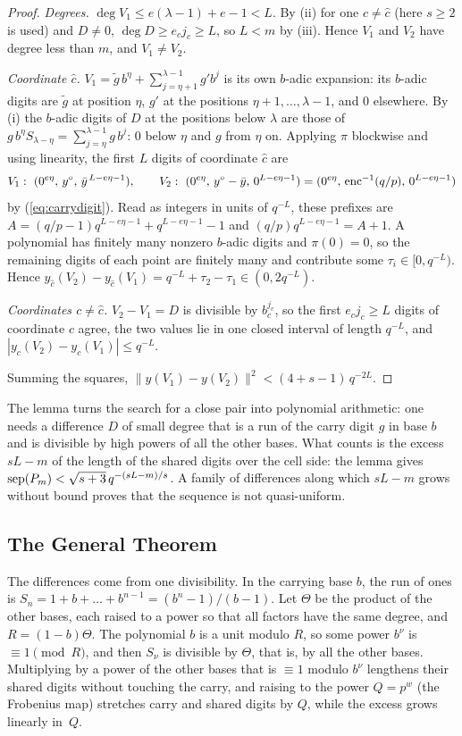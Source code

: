 \begin{proof}
\emph{Degrees.} $\deg V_1\le e(\lambda-1)+e-1<L$. By (ii) for one $c\ne\hat c$ (here $s\ge2$ is used) and $D\ne0$, $\deg D\ge e_cj_c\ge L$, so $L<m$ by (iii). Hence $V_1$ and $V_2$ have degree less than $m$, and $V_1\ne V_2$.

\emph{Coordinate $\hat c$.} $V_1=\tilde g\,b^\eta+\sum_{j=\eta+1}^{\lambda-1}g'b^j$ is its own $b$-adic expansion: its $b$-adic digits are $\tilde g$ at position $\eta$, $g'$ at the positions $\eta+1,\dots,\lambda-1$, and $0$ elsewhere. By (i) the $b$-adic digits of $D$ at the positions below $\lambda$ are those of $g\,b^\eta S_{\lambda-\eta}=\sum_{j=\eta}^{\lambda-1}g\,b^j$: $0$ below $\eta$ and $g$ from $\eta$ on. Applying $\pi$ blockwise and using linearity, the first $L$ digits of coordinate $\hat c$ are
\[
V_1:\ (0^{e\eta},\,y^\circ,\,\bar y^{\,L-e\eta-1}),\qquad V_2:\ (0^{e\eta},\,y^\circ-\bar y,\,0^{L-e\eta-1})=(0^{e\eta},\,\operatorname{enc}^{-1}(q/p),\,0^{L-e\eta-1})
\]
by (\ref{eq:carrydigit}). Read as integers in units of $q^{-L}$, these prefixes are $A=(q/p-1)q^{L-e\eta-1}+q^{L-e\eta-1}-1$ and $(q/p)q^{L-e\eta-1}=A+1$. A polynomial has finitely many nonzero $b$-adic digits and $\pi(0)=0$, so the remaining digits of each point are finitely many and contribute some $\tau_i\in[0,q^{-L})$. Hence $y_{\hat c}(V_2)-y_{\hat c}(V_1)=q^{-L}+\tau_2-\tau_1\in(0,2q^{-L})$.

\emph{Coordinates $c\ne\hat c$.} $V_2-V_1=D$ is divisible by $b_c^{j_c}$, so the first $e_cj_c\ge L$ digits of coordinate $c$ agree, the two values lie in one closed interval of length $q^{-L}$, and $|y_c(V_2)-y_c(V_1)|\le q^{-L}$.

Summing the squares, $\|y(V_1)-y(V_2)\|^2<(4+s-1)\,q^{-2L}$.
\end{proof}

The lemma turns the search for a close pair into polynomial arithmetic: one needs a difference $D$ of small degree that is a run of the carry digit $g$ in base $b$ and is divisible by high powers of all the other bases. What counts is the excess $sL-m$ of the length of the shared digits over the cell side: the lemma gives $\operatorname{sep}(P_m)<\sqrt{s+3}\,q^{-(sL-m)/s}$. A family of differences along which $sL-m$ grows without bound proves that the sequence is not quasi-uniform.

\subsection{The General Theorem}
The differences come from one divisibility. In the carrying base $b$, the run of ones is $S_n=1+b+\dots+b^{n-1}=(b^n-1)/(b-1)$. Let $\Theta$ be the product of the other bases, each raised to a power so that all factors have the same degree, and $R=(1-b)\Theta$. The polynomial $b$ is a unit modulo $R$, so some power $b^\nu$ is $\equiv1\pmod R$, and then $S_\nu$ is divisible by $\Theta$, that is, by all the other bases. Multiplying by a power of the other bases that is $\equiv1$ modulo $b^\nu$ lengthens their shared digits without touching the carry, and raising to the power $Q=p^w$ (the Frobenius map) stretches carry and shared digits by $Q$, while the excess grows linearly in~$Q$.

